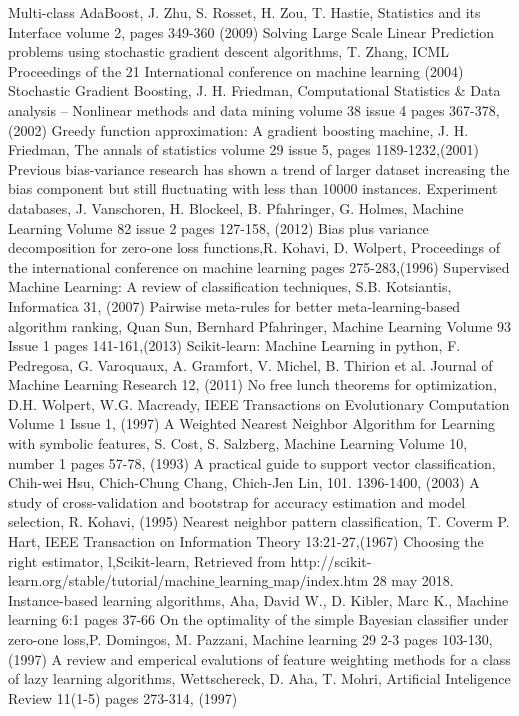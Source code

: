 \documentclass[a4paper,10pt]{article}
\begin{document}
\begin{thebibliography}{9}
 Multi-class AdaBoost, J. Zhu, S. Rosset, H. Zou, T. Hastie, Statistics and its Interface volume 2, pages 349-360 (2009)
 Solving Large Scale Linear Prediction problems using stochastic gradient descent algorithms, T. Zhang, ICML Proceedings of the 21 International conference on machine learning (2004)
 Stochastic Gradient Boosting, J. H. Friedman,  Computational Statistics \& Data analysis – Nonlinear methods and data mining volume 38 issue 4 pages 367-378,(2002)
 Greedy function approximation: A gradient boosting machine, J. H. Friedman, The annals of statistics volume 29 issue 5, pages 1189-1232,(2001)
Previous bias-variance research has shown a trend of larger dataset increasing the bias component but still fluctuating with  less than 10000 instances.
 Experiment databases, J. Vanschoren, H. Blockeel, B. Pfahringer, G. Holmes, Machine Learning Volume 82 issue 2 pages 127-158, (2012)
 Bias plus variance decomposition for zero-one loss functions,R. Kohavi, D. Wolpert, Proceedings of the international conference on machine learning pages 275-283,(1996)
 Supervised Machine Learning: A review of classification techniques, S.B. Kotsiantis, Informatica 31, (2007)
 Pairwise meta-rules for better meta-learning-based algorithm ranking, Quan Sun, Bernhard Pfahringer, Machine Learning Volume 93 Issue 1 pages 141-161,(2013)
 Scikit-learn: Machine Learning in python, F. Pedregosa, G. Varoquaux, A. Gramfort, V. Michel, B. Thirion et al. Journal of Machine Learning Research 12, (2011)
 No free lunch theorems for optimization, D.H. Wolpert, W.G. Macready, IEEE Transactions on Evolutionary Computation Volume 1 Issue 1, (1997)
 A Weighted Nearest Neighbor Algorithm for Learning with symbolic features, S. Cost, S. Salzberg, Machine Learning Volume 10, number 1 pages 57-78, (1993)
 A practical guide to support vector classification, Chih-wei Hsu, Chich-Chung Chang, Chich-Jen Lin, 101. 1396-1400, (2003)
 A study of cross-validation and bootstrap for accuracy estimation and model selection, R. Kohavi, (1995)
 Nearest neighbor pattern classification, T. Coverm P. Hart, IEEE Transaction on Information Theory 13:21-27,(1967)
 Choosing the right estimator, l,Scikit-learn, Retrieved from http://scikit-learn.org/stable/tutorial/machine$\_$learning$\_$map/index.htm 28 may 2018.
 Instance-based learning algorithms, Aha, David W., D. Kibler, Marc K., Machine learning 6:1 pages 37-66
 On the optimality of the simple Bayesian classifier under zero-one loss,P. Domingos, M. Pazzani, Machine learning 29 2-3 pages 103-130, (1997)
 A review and emperical evalutions of feature weighting methods for a class of lazy learning algorithms, Wettschereck, D. Aha, T. Mohri, Artificial Inteligence Review 11(1-5) pages 273-314, (1997)





 
     
\end{thebibliography}
\endgroup
\end{document}
